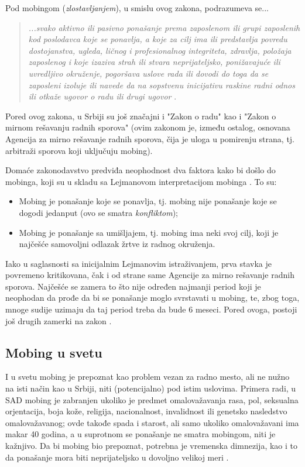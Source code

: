 \documentclass[a4paper]{article}
\newcommand{\quotes}[1]{"#1"}
\begin{document}
    Pod mobingom (\textit{zlostavljanjem}), u smislu ovog zakona, podrazumeva se...
    \begin{quote}
        \textit{...svako aktivno ili pasivno ponašanje prema zaposlenom ili grupi zaposlenih kod poslodavca koje se ponavlja, a koje za cilj ima ili predstavlja povredu dostojanstva, ugleda, ličnog i profesionalnog integriteta, zdravlja, položaja zaposlenog i koje izaziva strah ili stvara neprijateljsko, ponižavajuće ili uvredljivo okruženje, pogoršava uslove rada ili dovodi do toga da se zaposleni izoluje ili navede da na sopstvenu inicijativu raskine radni odnos ili otkaže ugovor o radu ili drugi ugovor} \cite{zszr}.
    \end{quote}
    Pored ovog zakona, u Srbiji su još značajni i \quotes{Zakon o radu} kao i \quotes{Zakon o mirnom rešavanju radnih sporova} (ovim zakonom je, između ostalog, osnovana Agencija za mirno rešavanje radnih sporova, čija je uloga u pomirenju strana, tj. arbitraži sporova koji uključuju mobing).
    
    Domaće zakonodavstvo predviđa neophodnost dva faktora kako bi došlo do mobinga, koji su u skladu sa Lejmanovom interpretacijom mobinga \cite{leymannmobbing}. To su:
    \begin{itemize}
        \item Mobing je ponašanje koje se ponavlja, tj. mobing nije ponašanje koje se dogodi jedanput (ovo se smatra \textit{konfliktom});
        \item Mobing je ponašanje sa umišljajem, tj. mobing ima neki svoj cilj, koji je najčešće samovoljni odlazak žrtve iz radnog okruženja.
    \end{itemize}
    Iako u saglasnosti sa inicijalnim Lejmanovim istraživanjem, prva stavka je povremeno kritikovana, čak i od strane same Agencije za mirno rešavanje radnih sporova. Najčešće se zamera to što nije određen najmanji period koji je neophodan da prođe da bi se ponašanje moglo svrstavati u mobing, te, zbog toga, mnoge sudije uzimaju da taj period treba da bude 6 meseci. Pored ovoga, postoji još drugih zamerki na zakon \cite{kritikazszr}.
    
    \subsection{Mobing u svetu}
    
    I u svetu mobing je prepoznat kao problem vezan za radno mesto, ali ne nužno na isti način kao u Srbiji, niti (potencijalno) pod istim uslovima. Primera radi, u SAD mobing je zabranjen ukoliko je predmet omalovažavanja rasa, pol, seksualna orjentacija, boja kože, religija, nacionalnost, invalidnost ili genetsko nasledstvo omalovažavanog; ovde takođe spada i starost, ali samo ukoliko omalovažavani ima makar 40 godina, a u suprotnom se ponašanje ne smatra mobingom, niti je kažnjivo. Da bi mobing bio prepoznat, potrebna je vremenska dimnezija, kao i to da ponašanje mora biti neprijateljsko u dovoljno velikoj meri \cite{usharassment}.
    
\end{document}
